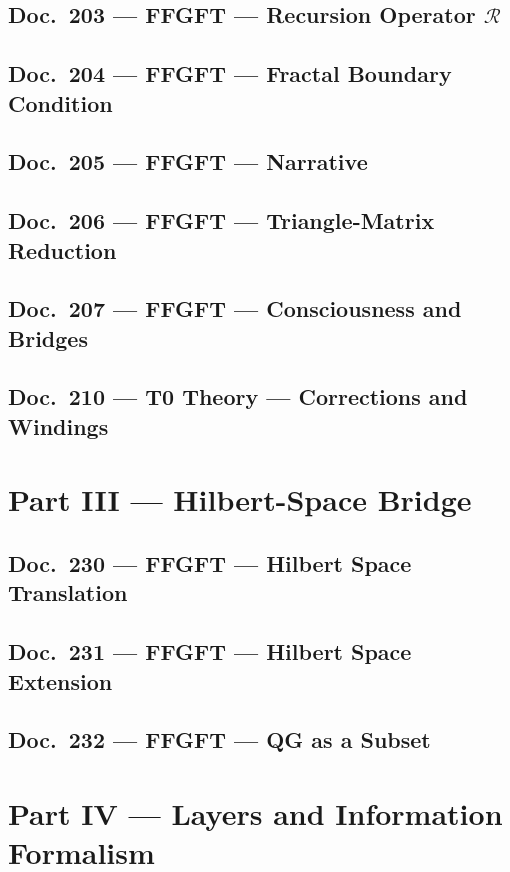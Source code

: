 	\chapter{Doc.~203 --- FFGFT — Recursion Operator $\mathcal{R}$}
	
	\chapter{Doc.~204 --- FFGFT — Fractal Boundary Condition}
	
	\chapter{Doc.~205 --- FFGFT — Narrative}
	
	\chapter{Doc.~206 --- FFGFT — Triangle-Matrix Reduction}
	
	\chapter{Doc.~207 --- FFGFT — Consciousness and Bridges}
	
	\chapter{Doc.~210 --- T0 Theory — Corrections and Windings}
	
	\part{Part III --- Hilbert-Space Bridge}
	\chapter{Doc.~230 --- FFGFT — Hilbert Space Translation}
	
	\chapter{Doc.~231 --- FFGFT — Hilbert Space Extension}
	
	\chapter{Doc.~232 --- FFGFT — QG as a Subset}
	
	\part{Part IV --- Layers and Information Formalism}
